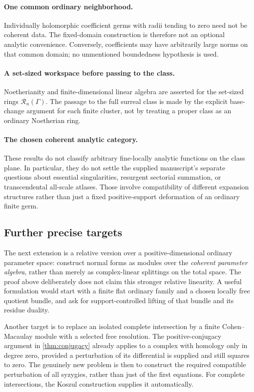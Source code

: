 \documentclass[11pt]{article}
\theoremstyle{definition}
\newcommand{\RR}{\mathscr R}
\begin{document}
\paragraph{One common ordinary neighborhood.}
Individually holomorphic coefficient germs with radii tending to zero need not be coherent data. The fixed-domain construction is therefore not an optional analytic convenience. Conversely, coefficients may have arbitrarily large norms on that common domain; no unmentioned boundedness hypothesis is used.

\paragraph{A set-sized workspace before passing to the class.}
Noetherianity and finite-dimensional linear algebra are asserted for the set-sized rings $\RR_n(\Gamma)$. The passage to the full surreal class is made by the explicit base-change argument for each finite cluster, not by treating a proper class as an ordinary Noetherian ring.

\paragraph{The chosen coherent analytic category.}
These results do not classify arbitrary fine-locally analytic functions on the class plane. In particular, they do not settle the supplied manuscript's separate questions about essential singularities, resurgent sectorial summation, or transcendental all-scale atlases. Those involve compatibility of different expansion structures rather than just a fixed positive-support deformation of an ordinary finite germ.

\subsection{Further precise targets}
The next extension is a relative version over a positive-dimensional ordinary parameter space: construct normal forms as modules over the \emph{coherent parameter algebra}, rather than merely as complex-linear splittings on the total space. The proof above deliberately does not claim this stronger relative linearity. A useful formulation would start with a finite flat ordinary family and a chosen locally free quotient bundle, and ask for support-controlled lifting of that bundle and its residue duality.

Another target is to replace an isolated complete intersection by a finite Cohen--Macaulay module with a selected free resolution. The positive-conjugacy argument in \cref{thm:conjugacy} already applies to a complex with homology only in degree zero, provided a perturbation of its differential is supplied and still squares to zero. The genuinely new problem is then to construct the required compatible perturbation of all syzygies, rather than just of the first equations. For complete intersections, the Koszul construction supplies it automatically.
\end{document}
